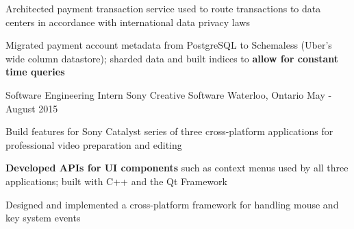 \begin{cventries}
{\begin{cvitems}
      \item Architected payment transaction service used to route transactions to data centers in accordance with international data privacy laws
      \item Migrated payment account metadata from PostgreSQL to Schemaless (Uber's wide column datastore); sharded data and built indices to \textbf{allow for constant time queries}
      \end{cvitems}
    }
  \cventry
    {Software Engineering Intern}
    {Sony Creative Software}
    {Waterloo, Ontario}
    {May - August 2015}
    {
      \begin{cvitems}
        \item Build features for Sony Catalyst series of three cross-platform applications for professional video preparation and editing
        \item \textbf{Developed APIs for UI components} such as context menus used by all three applications; built with C++ and the Qt Framework
        \item Designed and implemented a cross-platform framework for handling mouse and key system events
      \end{cvitems}
    }
\end{cventries}

